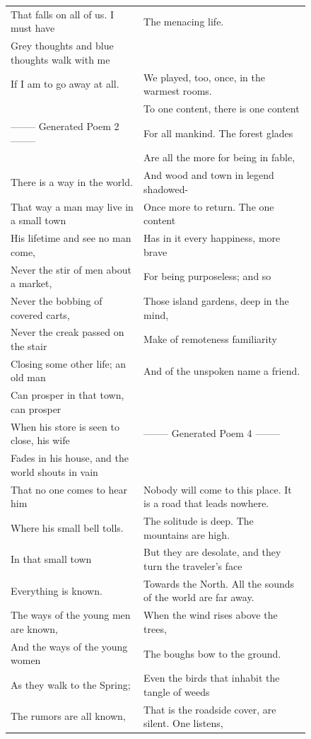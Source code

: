 \documentclass{article}
\begin{document}
\begin{figure}
{\begin{center}
\begin{tabular}{l l}
That falls on all of us. I must have & The menacing life.\\
Grey thoughts and blue thoughts walk with me & \\
If I am to go away at all. & We played, too, once, in the warmest rooms.\\
 & To one content, there is one content\\
 -------- Generated Poem 2  --------  & For all mankind. The forest glades\\
 & Are all the more for being in fable,\\
There is a way in the world. & And wood and town in legend shadowed-\\
That way a man may live in a small town & Once more to return. The one content\\
His lifetime and see no man come, & Has in it every happiness, more brave\\
Never the stir of men about a market, & For being purposeless; and so\\
Never the bobbing of covered carts, & Those island gardens, deep in the mind,\\
Never the creak passed on the stair & Make of remoteness familiarity\\
Closing some other life; an old man & And of the unspoken name a friend.\\
Can prosper in that town, can prosper & \\
When his store is seen to close, his wife &  -------- Generated Poem 4  --------  \\
Fades in his house, and the world shouts in vain & \\
That no one comes to hear him & Nobody will come to this place. It is a road that leads nowhere.\\
Where his small bell tolls. & The solitude is deep. The mountains are high.\\
In that small town & But they are desolate, and they turn the traveler’s face\\
Everything is known. & Towards the North. All the sounds of the world are far away.\\
The ways of the young men are known, & When the wind rises above the trees,\\
And the ways of the young women & The boughs bow to the ground.\\
As they walk to the Spring; & Even the birds that inhabit the tangle of weeds\\
The rumors are all known, & That is the roadside cover, are silent. One listens,\\

\end{tabular}
\end{center}}
\end{figure}
\end{document}
